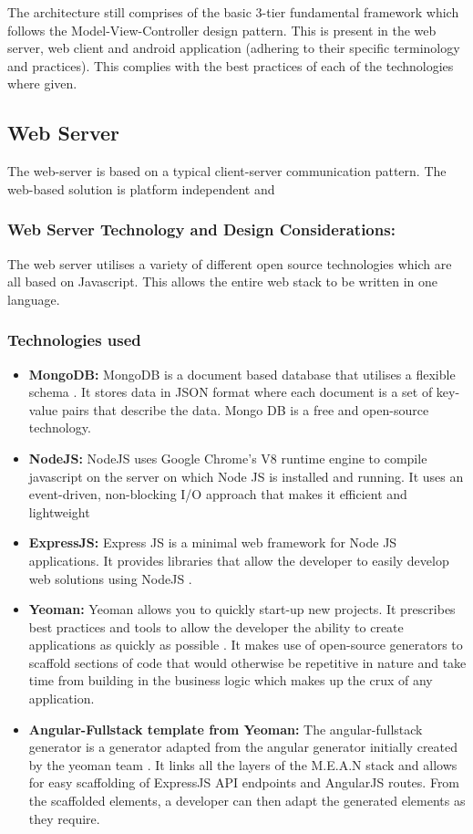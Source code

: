 \documentclass[12pt]{witseiepaper}
\begin{document}
The architecture still comprises of the basic 3-tier fundamental framework which follows the Model-View-Controller design pattern. This is present in the web server, web client and android application (adhering to their specific terminology and practices). This complies with the best practices of each of the technologies where given.


\subsection{Web Server}
The web-server is based on a typical client-server communication pattern. The web-based solution is platform independent and 
\subsubsection{Web Server Technology and Design Considerations:} 
The web server utilises a variety of different open source technologies which are all based on Javascript. This allows the entire web stack to be written in one language.

\subsubsection{Technologies used} 
\begin{itemize}
  \item \textbf{MongoDB:} MongoDB is a document based database that utilises a flexible schema \cite{MongoDB}. It stores data in JSON format where each document is a set of key-value pairs that describe the data. Mongo DB is a free and open-source technology.
  \item \textbf{NodeJS:} NodeJS uses Google Chrome's V8 runtime engine to compile javascript on the server on which Node JS is installed and running. It uses an event-driven, non-blocking I/O approach that makes it efficient and lightweight \cite{NodeJS}
  \item \textbf{ExpressJS:} Express JS is a minimal web framework for Node JS applications. It provides libraries that allow the developer to easily develop web solutions using NodeJS \cite{ExpressJS}.
  \item \textbf{Yeoman:} Yeoman allows you to quickly start-up new projects. It prescribes best practices and tools to allow the developer the ability to create applications as quickly as possible \cite{Yeoman}. It makes use of open-source generators to scaffold sections of code that would otherwise be repetitive in nature and take time from building in the business logic which makes up the crux of any application.
  \item \textbf{Angular-Fullstack template from Yeoman:} The angular-fullstack generator is a generator adapted from the angular generator initially created by the yeoman team \cite{AngularFullstack}. It links all the layers of the M.E.A.N stack and allows for easy scaffolding of ExpressJS API endpoints and AngularJS routes. From the scaffolded elements, a developer can then adapt the generated elements as they require.
\end{itemize}
\end{document}
